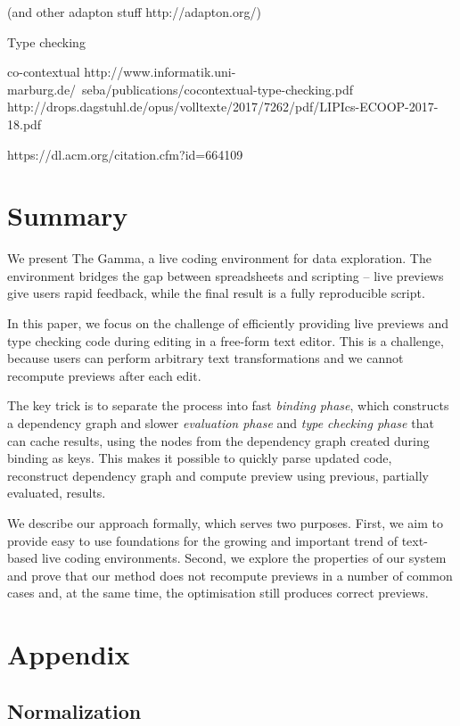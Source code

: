 \documentclass[acmsmall,anonymous,fleqn]{acmart}\settopmatter{printfolios=false,printccs=false,printacmref=false}
\theoremstyle{plain}
\theoremstyle{definition}
\begin{document}
  (and other adapton stuff http://adapton.org/)

Type checking

  co-contextual
  http://www.informatik.uni-marburg.de/~seba/publications/cocontextual-type-checking.pdf
  http://drops.dagstuhl.de/opus/volltexte/2017/7262/pdf/LIPIcs-ECOOP-2017-18.pdf

https://dl.acm.org/citation.cfm?id=664109

\section{Summary}
We present The Gamma, a live coding environment for data exploration. The environment
bridges the gap between spreadsheets and scripting -- live previews give users rapid feedback,
while the final result is a fully reproducible script.

In this paper, we focus on the challenge of efficiently providing live previews and type checking
code during editing in a free-form text editor. This is a challenge, because users can perform
arbitrary text transformations and we cannot recompute previews after each edit.

The key trick is to separate the process into fast \emph{binding phase},
which constructs a dependency graph and slower \emph{evaluation phase} and \emph{type checking phase}
that can cache results, using the nodes from the dependency graph created during binding as keys.
This makes it possible to quickly parse updated code, reconstruct dependency graph and compute
preview using previous, partially evaluated, results.

We describe our approach formally, which serves two purposes. First, we aim to provide easy to
use foundations for the growing and important trend of text-based live coding environments.
Second, we explore the properties of our system and prove that our method does not recompute
previews in a number of common cases and, at the same time, the optimisation still produces
correct previews.



\newpage
\appendix

\section{Appendix}

\subsection{Normalization}
\label{sec:app-normalization}
\end{document}
